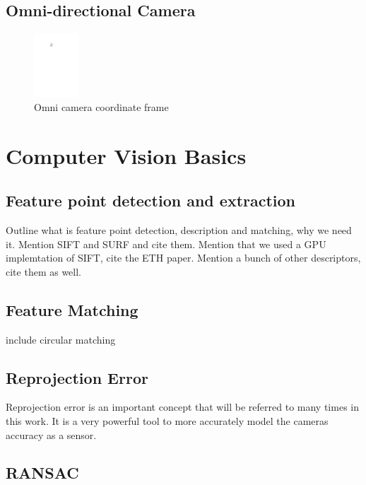 \subsection{Omni-directional Camera}

\begin{figure}[h]
  \centering
    \includegraphics[width=0.15\textwidth]{chapters/images/omni_coord_sys}
  \caption{Omni camera coordinate frame}
  \label{fig:omni_coord_sys}
\end{figure}

\section{Computer Vision Basics}
\label{sec:computer_vision}

\subsection{Feature point detection and extraction}
\label{subsec:features}

Outline what is feature point detection, description and matching, why we need it.  Mention SIFT and SURF and cite them.  Mention that we used a GPU implemtation of SIFT, cite the ETH paper. Mention a bunch of other descriptors, cite them as well.

\subsection{Feature Matching}

include circular matching

\subsection{Reprojection Error}

Reprojection error is an important concept that will be referred to many times in this work.  It is a very powerful tool to more accurately model the cameras accuracy as a sensor.

\subsection{RANSAC}
\label{subsec:RANSAC}

